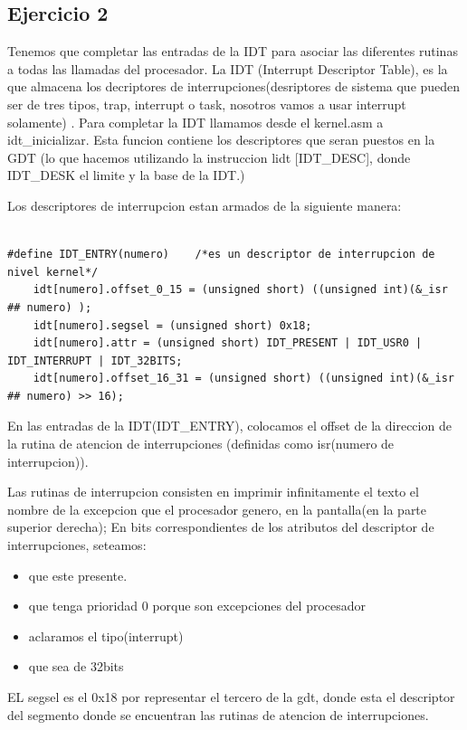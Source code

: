 \documentclass[a4paper]{article}
\newenvironment{codesnippet}{%
	\begin{Sbox}\begin{minipage}{\textwidth}\sffamily\small}%
	{\end{minipage}\end{Sbox}%
		\begin{center}%
		\vspace{-0.4cm}\colorbox{litegrey}{\TheSbox}\end{center}\vspace{0.3cm}}
\begin{document}
\subsection{Ejercicio 2}

	Tenemos que completar las entradas de la IDT para asociar las diferentes rutinas a todas las llamadas del procesador. La IDT (Interrupt Descriptor Table), es la que almacena los decriptores de interrupciones(desriptores de sistema que pueden ser de tres tipos, trap, interrupt o task, nosotros vamos a usar interrupt solamente)
.  	
	Para completar la IDT llamamos desde el kernel.asm a idt_inicializar.
	Esta funcion contiene los descriptores que seran puestos en la GDT (lo que hacemos utilizando la instruccion lidt [IDT_DESC], donde IDT_DESK el limite y la base de la IDT.)
	
	Los descriptores de interrupcion estan armados de la siguiente manera:
	
\begin{codesnippet}
\begin{verbatim}

#define IDT_ENTRY(numero)    /*es un descriptor de interrupcion de nivel kernel*/                                                                                    
    idt[numero].offset_0_15 = (unsigned short) ((unsigned int)(&_isr ## numero) );       
    idt[numero].segsel = (unsigned short) 0x18;                                                                 
    idt[numero].attr = (unsigned short) IDT_PRESENT | IDT_USR0 | IDT_INTERRUPT | IDT_32BITS;                                                                 
    idt[numero].offset_16_31 = (unsigned short) ((unsigned int)(&_isr ## numero) >> 16);

\end{verbatim}
\end{codesnippet}

	
	
	En las entradas de la IDT(IDT_ENTRY), colocamos el offset de la direccion de la rutina de atencion de interrupciones (definidas como isr(numero de interrupcion)).
	
	Las rutinas de interrupcion consisten en imprimir infinitamente el texto el nombre de  la excepcion que el procesador genero,  en la pantalla(en la parte superior derecha); En bits correspondientes de los atributos del descriptor de interrupciones, seteamos:
\begin{itemize}

\item	que este presente.
\item	que tenga  prioridad 0 porque son excepciones del procesador
\item	aclaramos el tipo(interrupt) 
\item	que sea de 32bits

\end{itemize}		
	EL segsel es el 0x18 por representar el tercero de la gdt, donde esta el descriptor del segmento donde se encuentran las rutinas de atencion de interrupciones.
	
\end{document}
